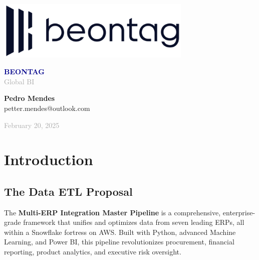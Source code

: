 \documentclass[a4paper,10pt]{article}
\begin{document}
\begin{titlepage}
    \centering
    \includegraphics[width=0.7\textwidth]{beontag_logo.png}

    \vspace{2cm}
    {\LARGE\textbf{\textcolor{darkblue}{BEONTAG}}} \\
    \vspace{0.5cm}
    {\Large\textcolor{darkgray}{Global BI }}

    \vfill
    {\LARGE \sffamily \textbf{Pedro Mendes}} \\
    {\large petter.mendes@outlook.com}
    
    \vspace{1.5cm}
    {\large \textcolor{darkgray}{February 20, 2025}}
\end{titlepage}

\tableofcontents
\newpage

\chapter{Introduction}

\section{The Data ETL Proposal}
The \textbf{Multi-ERP Integration Master Pipeline} is a comprehensive, enterprise-grade framework that unifies and optimizes data from seven leading ERPs, all within a Snowflake fortress on AWS. Built with Python, advanced Machine Learning, and Power BI, this pipeline revolutionizes procurement, financial reporting, product analytics, and executive risk oversight.
\end{document}
